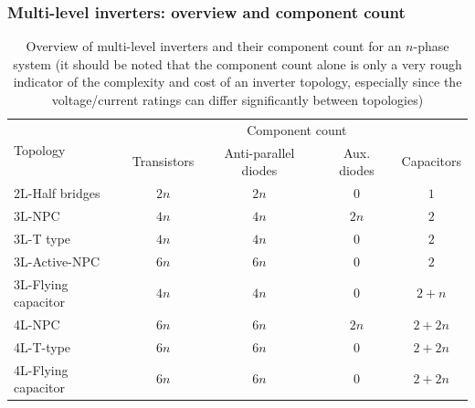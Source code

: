 \begin{frame}
    \frametitle{Multi-level inverters: overview and component count}
    \begin{table}
        \centering
        \begin{tabular}{lcccc}
            \toprule
            \multirow{2}{*}{Topology} & \multicolumn{4}{c}{Component count}                                                   \\
                                      & Transistors                         & Anti-parallel diodes & Aux. diodes & Capacitors \\
            \midrule
            2L-Half bridges           & $2n$                                & $2n$                 & $0$         & $1$        \\
            3L-NPC                    & $4n$                                & $4n$                 & $2n$        & $2$        \\
            3L-T type                 & $4n$                                & $4n$                 & $0$         & $2$        \\
            3L-Active-NPC             & $6n$                                & $6n$                 & $0$         & $2$        \\
            3L-Flying capacitor       & $4n$                                & $4n$                 & $0$         & $2+n$      \\
            4L-NPC                    & $6n$                                & $6n$                 & $2n$        & $2+2n$     \\
            4L-T-type                 & $6n$                                & $6n$                 & $0$         & $2+2n$     \\
            4L-Flying capacitor       & $6n$                                & $6n$                 & $0$         & $2+2n$     \\
            \bottomrule
        \end{tabular}
        \caption{Overview of multi-level inverters and their component count for an $n$-phase system (it should be noted that the component count alone is only a very rough indicator of the complexity and cost of an inverter topology, especially since the voltage/current ratings can differ significantly between topologies)}
    \end{table}
\end{frame}

